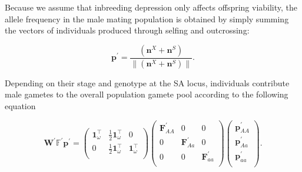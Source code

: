 \documentclass[11pt,draft]{article}
\def\mbf#1{\mathbf{#1}}
\def\mbb#1{\mathbb{#1}}
\begin{document}
Because we assume that inbreeding depression only affects offspring viability, the allele frequency in the male mating population is obtained by simply summing the vectors of individuals produced through selfing and outcrossing:
\begin{linenomath*}
\begin{equation}
 	\mbf{p}^{\prime}=\frac{(\mbf{n}^X + \mbf{n}^S)}{\| (\mbf{n}^X + \mbf{n}^S)\|}.
 \end{equation}
\end{linenomath*}
Depending on their stage and genotype at the SA locus, individuals contribute male gametes to the overall population gamete pool according to the following equation
\begin{linenomath*}
\begin{equation}
		\mbf{W}^{\prime} \mbb{F}^{\prime} \mbf{p}^{\prime}= 
		\left(
			\begin{array}{ccc}
				\mbf{1}^{\intercal}_{\omega} & \frac{1}{2} \mbf{1}^{\intercal}_{\omega} & 0 \\
				0 & \frac{1}{2} \mbf{1}^{\intercal}_{\omega} & \mbf{1}^{\intercal}_{\omega} \\
			\end{array} \right)
		\left(
			\begin{array}{ccc}
				\mbf{F}^{\prime}_{AA} & 0 & 0 \\
				0 & \mbf{F}^{\prime}_{Aa} & 0 \\
				0 & 0 & \mbf{F}^{\prime}_{aa} \\
			\end{array} \right)
		\left(
			\begin{array}{c}
				\mbf{p}^{\prime}_{AA} \\
				\mbf{p}^{\prime}_{Aa} \\
				\mbf{p}^{\prime}_{aa} \\
			\end{array} \right).
\end{equation}
\end{linenomath*}
\end{document}
